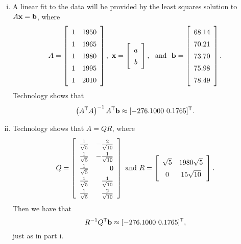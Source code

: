 \item 
	\begin{enumerate}[i.]
	\item A linear fit to the data will be provided by the least squares solution to $A \mathbf{x} = \mathbf{b}$, where 
\[A = \left[ \begin{array}{cc} 1&1950 \\ 1&1965 \\ 1 &1980 \\  1&1995 \\ 1 &2010 \end{array} \right], \ \vx = \left[ \begin{array}{c} a\\b \end{array} \right], \ \text{ and } \ \vb =  \left[ \begin{array}{c} 68.14\\70.21\\73.70\\75.98	\\78.49 \end{array} \right].\]
Technology shows that 
\[\left(A^{\mathsf{T}}A\right)^{-1}A^{\mathsf{T}} \mathbf{b} \approx [-276.1000 \ 0.1765]^{\mathsf{T}}.\]
	
	\item Technology shows that $A = QR$, where 
\[Q = \left[\renewcommand{\arraystretch}{1.4}  \begin{array}{cr} \frac{1}{\sqrt{5}}&-\frac{2}{\sqrt{10}} \\ \frac{1}{\sqrt{5}}&-\frac{1}{\sqrt{10}} \\ \frac{1}{\sqrt{5}}&0 \\ \frac{1}{\sqrt{5}}&\frac{1}{\sqrt{10}} \\ \frac{1}{\sqrt{5}}&\frac{2}{\sqrt{10}} \end{array} \right] \text{ and } R = \left[ \begin{array}{cc} \sqrt{5}&1980 \sqrt{5} \\ 0&15 \sqrt{10} \end{array} \right].\]
Then we have that 
\[R^{-1} Q^{\tr} \vb \approx [-276.1000 \ 0.1765]^{\tr},\]
just as in part i. 	

	\end{enumerate}
	
\ea

